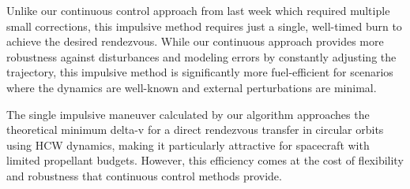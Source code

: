 Unlike our continuous control approach from last week which required multiple small corrections, this impulsive method requires just a single, well-timed burn to achieve the desired rendezvous. While our continuous approach provides more robustness against disturbances and modeling errors by constantly adjusting the trajectory, this impulsive method is significantly more fuel-efficient for scenarios where the dynamics are well-known and external perturbations are minimal.

The single impulsive maneuver calculated by our algorithm approaches the theoretical minimum delta-v for a direct rendezvous transfer in circular orbits using HCW dynamics, making it particularly attractive for spacecraft with limited propellant budgets. However, this efficiency comes at the cost of flexibility and robustness that continuous control methods provide.